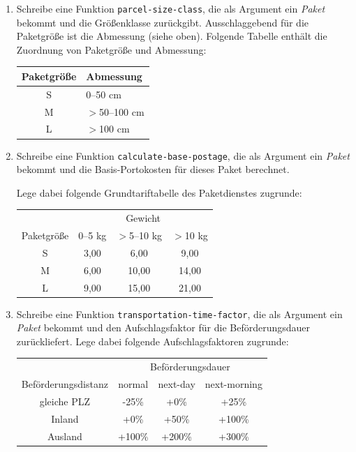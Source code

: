 \begin{aufgabe}
\begin{enumerate}
  \item Schreibe eine Funktion \lstinline{parcel-size-class}, die
    als Argument ein \textit{Paket} bekommt und die Größenklasse
    zurückgibt.  Ausschlaggebend für die Paketgröße ist die Abmessung
    (siehe oben).  Folgende Tabelle enthält die Zuordnung von
    Paketgröße und Abmessung:

    \begin{center}
      \begin{tabular}{c|l}
        Paketgröße & Abmessung \\
        \hline
        S & 0--50 cm \\
        M & $>$50--100 cm \\
        L & $>$100 cm \\
      \end{tabular}
    \end{center}

  \item Schreibe eine Funktion \lstinline{calculate-base-postage},
    die als Argument ein \textit{Paket} bekommt und die
    Basis-Portokosten für dieses Paket berechnet.

    Lege dabei
    folgende Grundtariftabelle des Paketdienstes zugrunde:

    \begin{center}
      \begin{tabular}{c|ccc}
        & \multicolumn{3}{c}{Gewicht} \\
        Paketgröße & 0--5 kg & $>$5--10 kg & $>$10 kg \\
        \hline
        S & 3,00 & 6,00 & 9,00 \\
        M & 6,00 & 10,00 & 14,00 \\
        L & 9,00 & 15,00 & 21,00 \\
      \end{tabular}
    \end{center}

    

  \item Schreibe eine Funktion
    \lstinline{transportation-time-factor}, die als Argument ein
    \textit{Paket} bekommt und den Aufschlagsfaktor für die
    Beförderungsdauer zurückliefert.  Lege dabei folgende
    Aufschlagsfaktoren zugrunde:
    
    \begin{center}
      \begin{tabular}{c|ccc}
        & \multicolumn{3}{c}{Beförderungsdauer} \\
        Beförderungsdistanz & normal & next-day & next-morning \\
        \hline
        gleiche PLZ & -25\% & +0\% & +25\% \\
        Inland & +0\% & +50\% & +100\% \\
        Ausland & +100\% & +200\% & +300\% \\
      \end{tabular}
    \end{center}
    

\end{enumerate}
\end{aufgabe}
